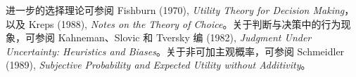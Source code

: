 进一步的选择理论可参阅 Fishburn (1970), \emph{Utility Theory for Decision Making}，以及 Kreps (1988), \emph{Notes on the Theory of Choice}。关于判断与决策中的行为现象，可参阅 Kahneman、Slovic 和 Tversky 编 (1982), \emph{Judgment Under Uncertainty: Heuristics and Biases}。关于非可加主观概率，可参阅 Schmeidler (1989), \emph{Subjective Probability and Expected Utility without Additivity}。
\fi

\WJChapterExercises

\endgroup

